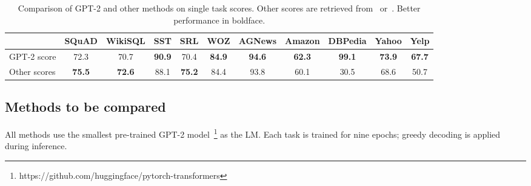 \documentclass{article} \usepackage{iclr2020_conference,times}
\begin{document}
 \begin{table*}[t]
\centering
    \begin{adjustbox}{max width=\textwidth}
    \begin{tabular}{l*{10}{c}}
    \toprule
    & SQuAD & WikiSQL & SST & SRL & WOZ & AGNews & Amazon & DBPedia & Yahoo & Yelp \\
    \midrule
    GPT-2 score & 72.3 & 70.7 & \textbf{90.9} & 70.4 & \textbf{84.9} & \textbf{94.6} & \textbf{62.3} & \textbf{99.1} & \textbf{73.9} & \textbf{67.7} \\
    Other scores & \textbf{75.5} & \textbf{72.6} & 88.1 &  \textbf{75.2} & 84.4 & 93.8 & 60.1 & 30.5 & 68.6 & 50.7 \\
\bottomrule
    \end{tabular}
    \end{adjustbox}
    \caption{Comparison of GPT-2 and other methods on single task scores. Other scores are retrieved from~\cite{McCann2018decaNLP} or~\cite{d2019episodic}. Better performance in boldface.}
\label{tab:single_task}
\end{table*} 
\subsection{Methods to be compared}

All methods use the smallest pre-trained GPT-2 model~\citep{radford2019language}\footnote{https://github.com/huggingface/pytorch-transformers} as the LM.
Each task is trained for nine epochs; greedy decoding is applied during inference.
\end{document}
